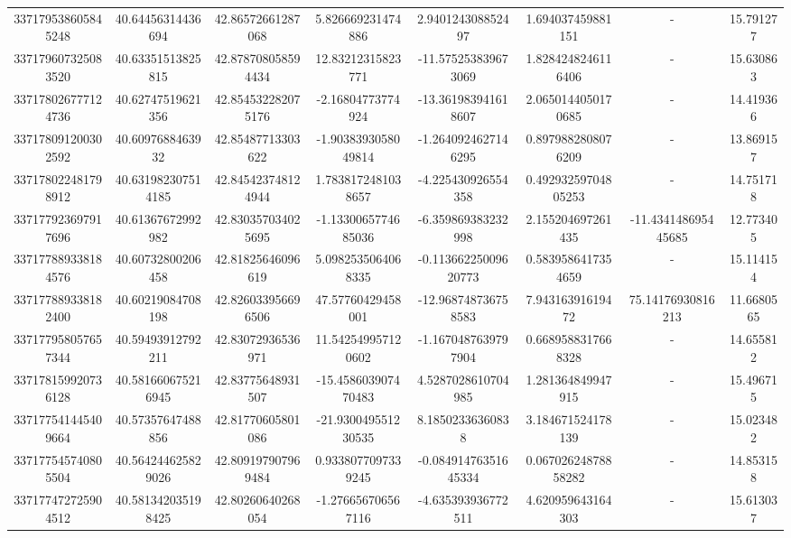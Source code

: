 \documentclass{article}
\begin{document}
\begin{landscape}
\begin{longtable}[c]{S[table-format=18.0]S[table-format=2.15]S[table-format=2.15]S[table-format=-2.17]S[table-format=-2.16]S[table-format=-2.16]S[table-format=-3.16]S[table-format=2.7]}
337179538605845248 & 40.64456314436694  & 42.86572661287068  & 5.826669231474886     & 2.940124308852497    & 1.694037459881151    & {-}                  & 15.791277  \\
337179607325083520 & 40.63351513825815  & 42.878708058594434 & 12.83212315823771     & -11.575253839673069  & 1.8284248246116406   & {-}                  & 15.630863  \\
337178026777124736 & 40.62747519621356  & 42.854532282075176 & -2.16804773774924     & -13.361983941618607  & 2.0650144050170685   & {-}                  & 14.419366  \\
337178091200302592 & 40.6097688463932   & 42.85487713303622  & -1.9038393058049814   & -1.2640924627146295  & 0.8979882808076209   & {-}                  & 13.869157  \\
337178022481798912 & 40.631982307514185 & 42.845423748124944 & 1.7838172481038657    & -4.225430926554358   & 0.49293259704805253  & {-}                  & 14.751718  \\
337177923697917696 & 40.61367672992982  & 42.830357034025695 & -1.1330065774685036   & -6.359869383232998   & 2.155204697261435    & -11.434148695445685 & 12.773405  \\
337177889338184576 & 40.60732800206458  & 42.81825646096619  & 5.0982535064068335    & -0.11366225009620773 & 0.5839586417354659   & {-}                  & 15.114154  \\
337177889338182400 & 40.60219084708198  & 42.826033956696506 & 47.57760429458001     & -12.968748736758583  & 7.94316391619472     & 75.14176930816213   & 11.6680565 \\
337177958057657344 & 40.59493912792211  & 42.83072936536971  & 11.542549957120602    & -1.1670487639797904  & 0.6689588317668328   & {-}                  & 14.655812  \\
337178159920736128 & 40.581660675216945 & 42.83775648931507  & -15.458603907470483   & 4.5287028610704985   & 1.281364849947915    & {-}                  & 15.496715  \\
337177541445409664 & 40.57357647488856  & 42.81770605801086  & -21.930049551230535   & 8.18502336360838     & 3.184671524178139    & {-}                  & 15.023482  \\
337177545740805504 & 40.564244625829026 & 42.809197907969484 & 0.9338077097339245    & -0.08491476351645334 & 0.06702624878858282  & {-}                  & 14.853158  \\
337177472725904512 & 40.581342035198425 & 42.80260640268054  & -1.276656706567116    & -4.635393936772511   & 4.620959643164303    & {-}                  & 15.613037 
 \end{longtable}


\end{landscape}
\end{document}
